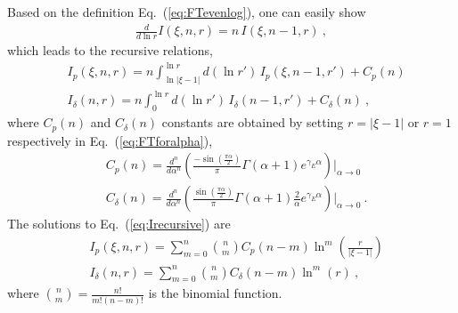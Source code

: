 \documentclass[a4paper,11pt]{article}
\begin{document}
Based on the definition Eq.~(\ref{eq:FTevenlog}), one can easily show 
\begin{align}
\frac{d}{d\ln r} I(\xi, n,r) = n \, I(\xi, n-1,r) \ ,
\end{align} 
which leads to the recursive relations,
\begin{align}\label{eq:Irecursive}
&I_{p}(\xi, n,r) = n \int^{\ln r}_{\ln |\xi-1|} d(\ln r') \, I_p(\xi, n-1,r') + C_p(n) \nonumber\\
&I_{\delta}(n,r) = n \int^{\ln r}_{0} d(\ln r') \, I_{\delta}(n-1,r') + C_{\delta}(n) \ ,
\end{align}
where $C_p(n)$ and $C_\delta (n)$ constants are obtained by setting $r=|\xi-1|$ or $r=1$ respectively in Eq.~(\ref{eq:FTforalpha}),
\begin{align}\label{eq:Cp&Cdelta}
&C_p(n) = \frac{d^n}{d\alpha^n} \left(\frac{-\sin\left(\frac{\pi \alpha}{2}\right)}{\pi} \Gamma (\alpha +1) e^{\gamma_E  \alpha }  \right) \Bigg|_{\alpha \rightarrow 0} \nonumber\\
&C_{\delta}(n) = \frac{d^n}{d\alpha^n}\left( \frac{\sin\left(\frac{\pi \alpha}{2}\right)}{\pi} \Gamma (\alpha +1) \frac{2}{\alpha} e^{\gamma_E  \alpha } \right) \Bigg|_{\alpha \rightarrow 0} \  .
\end{align}
The solutions to Eq.~(\ref{eq:Irecursive}) are
\begin{align}\label{eq:Ip&Idelta}
&I_{p}(\xi, n,r) = \sum_{m=0}^{n} \binom{n}{m} C_{p}(n-m) \ln^{m}\left(\frac{r}{|\xi-1|}\right) \nonumber\\
&I_{\delta}(n,r) = \sum_{m=0}^{n} \binom{n}{m} C_{\delta}(n-m) \ln^{m}\left(r\right)  \ , 
\end{align}
where $\binom{n}{m} = \frac{n!}{m!(n-m)!}$ is the binomial function.
\end{document}
